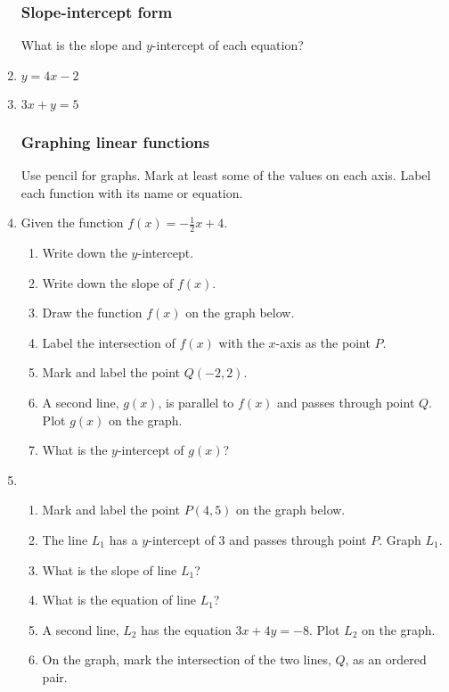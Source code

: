 \documentclass[12pt, oneside]{article}
\begin{document}
\begin{enumerate}
\subsubsection*{Slope-intercept form}

What is the slope and $y$-intercept of each equation?
\item   $y=4x-2$ \vspace{1.5cm}
\item   $3x+y=5$ \vspace{3cm}


\newpage
\subsubsection*{Graphing linear functions}
Use pencil for graphs. Mark at least some of the values on each axis. Label each function with its name or equation.
\item Given the function $f(x)=-\frac{1}{2}x+4$.
\begin{enumerate}
    \item Write down the $y$-intercept. \bigskip
    \item Write down the slope of $f(x)$. \bigskip
    \item Draw the function $f(x)$ on the graph below.
    \item Label the intersection of $f(x)$ with the $x$-axis as the point $P$.
    \item Mark and label the point $Q (-2, 2)$.
    \item A second line, $g(x)$, is parallel to $f(x)$ and passes through point $Q$. Plot $g(x)$ on the graph.
    \item What is the $y$-intercept of $g(x)$? \bigskip
\end{enumerate}

\begin{center} %
\end{center}

\newpage
\item
  \begin{enumerate}
    \item Mark and label the point $P(4, 5)$ on the graph below.
    \item The line $L_1$ has a $y$-intercept of 3 and passes through point $P$. Graph $L_1$.
    \item What is the slope of line $L_1$? \vspace{2cm}
    \item What is the equation of line $L_1$? \vspace{2cm}
    \item A second line, $L_2$ has the equation $3x+4y=-8$. Plot $L_2$ on the graph.
    \item On the graph, mark the intersection of the two lines, $Q$, as an ordered pair.
  \end{enumerate}


\end{enumerate}
\end{document}
